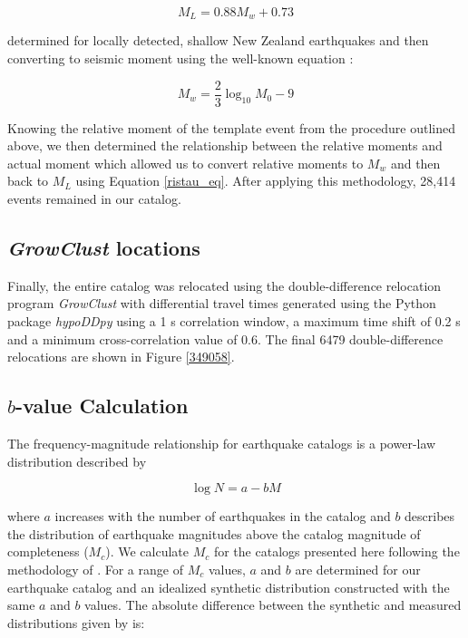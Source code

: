 \begin{equation}\label{ristau_eq}
M_{L} = 0.88M_{w} + 0.73
\end{equation}

determined for locally detected, shallow New Zealand earthquakes \citep{Ristau_2009} and then converting to seismic moment using the well-known equation \citep{Hanks_1979}:

\begin{equation}
M_w = \frac{2}{3}\log_{10}M_{0} - 9
\end{equation}

Knowing the relative moment of the template event from the procedure outlined above, we then determined the relationship between the relative moments and actual moment which allowed us to convert relative moments to $M_w$ and then back to $M_L$ using Equation \ref{ristau_eq}. After applying this methodology, 28,414 events remained in our catalog.

\subsection{\textit{GrowClust} locations}
Finally, the entire catalog was relocated using the double-difference relocation program \textit{GrowClust} \citep{Trugman_2017} with differential travel times generated using the Python package \textit{hypoDDpy} \citep{lion_krischer_2015_18907} using a 1 s correlation window, a maximum time shift of 0.2 s and a minimum cross-correlation value of 0.6. The final 6479 double-difference relocations are shown in Figure \ref{349058}.

\subsection{$b$-value Calculation}\label{b-method}
The frequency-magnitude relationship for earthquake catalogs is a power-law distribution described by

\begin{equation}
\log{N} = a - bM
\end{equation}

\citep{gutenberg1942earthquake} where $a$ increases with the number of earthquakes in the catalog and $b$ describes the distribution of earthquake magnitudes above the catalog magnitude of completeness ($M_c$). We calculate $M_c$ for the catalogs presented here following the methodology of \citet{Wiemer_2000}. For a range of $M_c$ values, $a$ and $b$ are determined for our earthquake catalog and an idealized synthetic distribution constructed with the same $a$ and $b$ values. The absolute difference between the synthetic and measured distributions given by \cite{Wiemer_2000} is:

